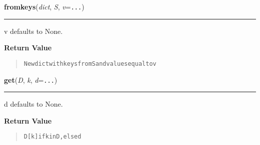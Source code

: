     \begin{boxedminipage}{\textwidth}

    \raggedright \textbf{fromkeys}(\textit{dict}, \textit{S}, \textit{v}=\texttt{...})

    \vspace{-1.5ex}

    \rule{\textwidth}{0.5\fboxrule}
    v defaults to None.

    \vspace{1ex}

      \textbf{Return Value}
      \begin{quote}
\begin{alltt}
New dict with keys from S and values equal to v
\end{alltt}

      \end{quote}

    \vspace{1ex}

    \end{boxedminipage}

    \label{dict:get}

    \vspace{0.5ex}

    \begin{boxedminipage}{\textwidth}

    \raggedright \textbf{get}(\textit{D}, \textit{k}, \textit{d}=\texttt{...})

    \vspace{-1.5ex}

    \rule{\textwidth}{0.5\fboxrule}
    d defaults to None.

    \vspace{1ex}

      \textbf{Return Value}
      \begin{quote}
\begin{alltt}
D[k] if k in D, else d
\end{alltt}

      \end{quote}

    \vspace{1ex}

    \end{boxedminipage}

    \label{dict:has_key}

    \vspace{0.5ex}

